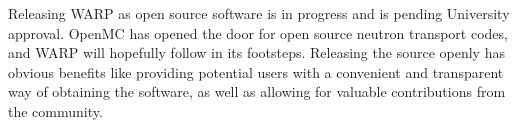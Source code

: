 Releasing WARP as open source software is in progress and is pending University approval.  OpenMC has opened the door for open source neutron transport codes, and WARP will hopefully follow in its footsteps.  Releasing the source openly has obvious benefits like providing potential users with a convenient and transparent way of obtaining the software, as well as allowing for valuable contributions from the community.  



